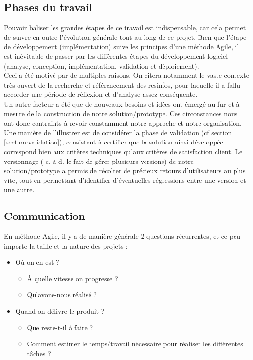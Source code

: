 \subsection*{Phases du travail}

Pouvoir baliser les grandes étapes de ce travail est indispensable, car cela permet de suivre en outre l'évolution générale tout au long de ce projet. Bien que l'étape de développement (implémentation) suive les principes d'une méthode Agile\cite{agileManifeste}, il est inévitable de passer par les différentes étapes du développement logiciel (analyse, conception, implémentation, validation et déploiement). \\

Ceci a été motivé par de multiples raisons. On citera notamment le vaste contexte très ouvert de la recherche et référencement des \glspl{resinfo}, pour laquelle il a fallu accorder une période de réflexion et d'analyse assez conséquente. \\

Un autre facteur a été que de nouveaux besoins et idées ont émergé au fur et à mesure de la construction de notre solution/prototype. Ces circonstances nous ont donc contraints à revoir constamment notre approche et notre organisation. 
Une manière de l'illustrer est de considérer la phase de validation (cf section \ref{section:validation}), consistant à certifier que la solution ainsi développée correspond bien aux critères techniques qu'aux critères de satisfaction client. Le versionnage ( c.-à-d. le fait de gérer plusieurs versions) de notre solution/prototype a permis de récolter de précieux retours d'utilisateurs au plus vite, tout en permettant d'identifier d'éventuelles régressions entre une version et une autre. \\

\subsection*{Communication}

En méthode Agile\cite{agileManifeste}, il y a de manière générale 2 questions récurrentes, et ce peu importe la taille et la nature des projets :
\begin{itemize}
    \item Où on en est ? 
    \begin{itemize}
        \item À quelle vitesse on progresse ?
        \item Qu'avons-nous réalisé ?
    \end{itemize}
    \item Quand on délivre le produit ?
    \begin{itemize}
        \item Que reste-t-il à faire ?
        \item Comment estimer le temps/travail nécessaire pour réaliser les différentes tâches ?
    \end{itemize}
\end{itemize}

